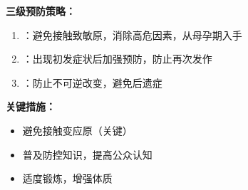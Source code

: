 \begin{keybox}
\textbf{三级预防策略：}
\begin{enumerate}[leftmargin=*]
    \item {}：避免接触致敏原，消除高危因素，从母孕期入手
    \item {}：出现初发症状后加强预防，防止再次发作
    \item {}：防止不可逆改变，避免后遗症
\end{enumerate}

\textbf{关键措施：}
\begin{itemize}[leftmargin=*]
    \item 避免接触变应原（关键）
    \item 普及防控知识，提高公众认知
    \item 适度锻炼，增强体质
\end{itemize}
\end{keybox}

\newpage
